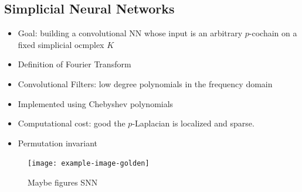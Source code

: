\subsection{Simplicial Neural Networks}
\begin{itemize}
\item Goal: building a convolutional NN whose input is an arbitrary $p$-cochain on a fixed simplicial ocmplex $K$
\item  Definition of Fourier Transform
\item Convolutional Filters: low degree polynomials in the frequency domain
\item Implemented using Chebyshev polynomials
\item Computational cost: good the $p$-Laplacian is localized and sparse.
\item Permutation invariant
\end{itemize}

\begin{figure}[htbp]
  \centering

\texttt{[image: example-image-golden]}
  \caption{Maybe figures SNN} \label{fig:SNN}
\end{figure}